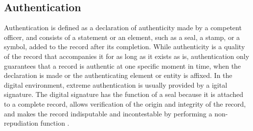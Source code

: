 \subsection{Authentication}
Authentication is defined as a declaration of authenticity made by a competent officer, and consists of a statement or an element, such as a seal, a stamp, or a symbol, added to the record after its completion. While authenticity is a quality of the record that accompanies it for as long as it exists as is, authentication only guarantees that a record is authentic at one specific moment in time, when the declaration is made or the authenticating element or entity is affixed. In the digital environment, extreme authentication is usually provided by a  igital signature. The digital signature has the function of a seal because it is attached to a complete record, allows verification of the origin and integrity of the record, and makes the record indisputable and incontestable by performing a non-repudiation function \cite[53]{duranti2009digital}.
